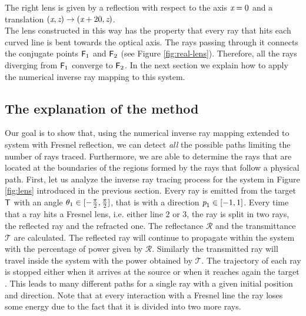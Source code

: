 The right lens is given by a reflection with respect to the axis $\textit{x}=0$ and a translation $(\textit{x}, \textit{z})\rightarrow (\textit{x}+20, \textit{z})$.
\\ \indent The lens constructed in this way has the property that every ray that hits each curved line is bent towards the optical axis. The rays passing through it connects the conjugate points $\textsf{F}_1 $ and $\textsf{F}_2$ (see Figure \ref{fig:real-lens}). Therefore, all the rays diverging from $\textsf{F}_1$ converge to $\textsf{F}_2$. In the next section we explain how to apply the numerical inverse ray mapping to this system.
\subsection{The explanation of the method}
Our goal is to show that, using the numerical inverse ray mapping extended to system with Fresnel reflection, we can detect \textit{all} the possible paths limiting the number of rays traced. Furthermore, we are able to determine the rays that are located at the boundaries of the regions formed by the rays that follow a physical path.
First, let us analyze the inverse ray tracing process for the system in Figure \ref{fig:lens} introduced in the previous section. Every ray is emitted from the target $\textsf{T}$ with an angle $\theta_1\in[-\frac{\pi}{2}, \frac{\pi}{2}]$, that is with a direction $\textit{p}_1\in[-1,1]$. Every time that a ray hits a Fresnel lens, i.e. either line $2$ or $3$, the ray is split in two rays, the reflected ray and the refracted one. The reflectance $\mathcal{R}$ and the transmittance $\mathcal{T}$ are calculated. The reflected ray will continue to propagate within the system with the percentage of power given by $\mathcal{R}$. Similarly the transmitted ray will travel inside the system with the power obtained by $\mathcal{T}$. The trajectory of each ray is stopped either when it arrives at the source  or when it reaches again the target . This leads to many different paths for a single ray with a given initial position and direction. Note that at every interaction with a Fresnel line the ray loses some energy due to the fact that it is divided into two more rays.
